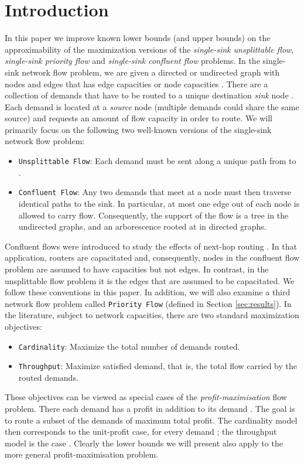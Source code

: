 \documentclass[12pt]{article}
\begin{document}
\section{Introduction}
In this paper we improve known lower bounds (and upper bounds) on the approximability
of the maximization versions of the {\em single-sink unsplittable flow}, {\em single-sink priority flow}
and {\em single-sink confluent flow} problems.
In the single-sink network flow problem, we are given
a directed or undirected graph  with  nodes and  edges that has edge capacities  or
node capacities . There are a collection of demands
that have to be routed to a unique destination {\em sink} node .
Each demand  is located at a {\em source} node  (multiple demands could share the same source)
and requests an amount  of flow capacity in order to route.
We will primarily focus on the following two well-known versions of the single-sink network flow problem:
\begin{itemize}
\item {\tt Unsplittable Flow}: Each demand  must be sent along a unique path  from
 to .
\item {\tt Confluent Flow}: Any two demands that meet at a node must then traverse identical paths
to the sink.  In particular, at most one edge out of each node  is allowed to carry flow.
Consequently, the support of the flow is a tree in the
undirected graphs, and an arborescence rooted at  in directed graphs.
\end{itemize}
Confluent flows were introduced to study the effects of next-hop routing \cite{Chen05}.
In that application, routers are capacitated and, consequently, nodes
in the confluent flow problem are assumed to have capacities but not edges.
In contrast, in the unsplittable flow problem it is the edges that are assumed to
be capacitated. We follow these conventions in this paper.
In addition, we will also examine a third network flow problem called {\tt Priority Flow} (defined in Section \ref{sec:results}).
In the literature, subject to network capacities, there are two standard maximization objectives:



\begin{itemize}
\item {\tt Cardinality}: Maximize the total number of demands routed.
\item {\tt Throughput}: Maximize satisfied demand, that is, the total flow carried by the routed demands.
\end{itemize}
These objectives can be viewed as special cases of the
{\em profit-maximisation} flow problem. There each demand  has
a profit  in addition to its demand . The goal is to route a subset
of the demands of maximum total profit. The cardinality model then corresponds to the
unit-profit case,  for every demand ; the throughput model is the case .
Clearly the lower bounds we will present also apply to the more general
profit-maximisation problem.
\end{document}
